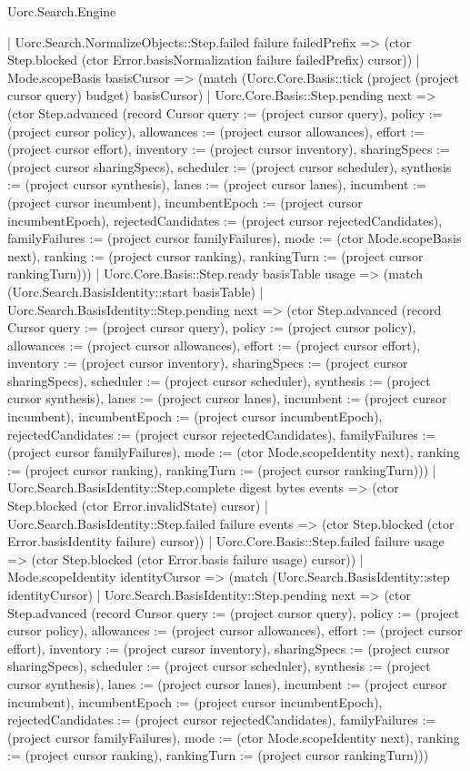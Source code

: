 \begin{lexlean}{Uorc.Search.Engine}
\begin{semanticmodule}
{      | Uorc.Search.NormalizeObjects::Step.failed failure failedPrefix => (ctor Step.blocked (ctor Error.basisNormalization failure failedPrefix) cursor))
    | Mode.scopeBasis basisCursor => (match (Uorc.Core.Basis::tick (project (project cursor query) budget) basisCursor)
      | Uorc.Core.Basis::Step.pending next => (ctor Step.advanced (record Cursor {query := (project cursor query), policy := (project cursor policy), allowances := (project cursor allowances), effort := (project cursor effort), inventory := (project cursor inventory), sharingSpecs := (project cursor sharingSpecs), scheduler := (project cursor scheduler), synthesis := (project cursor synthesis), lanes := (project cursor lanes), incumbent := (project cursor incumbent), incumbentEpoch := (project cursor incumbentEpoch), rejectedCandidates := (project cursor rejectedCandidates), familyFailures := (project cursor familyFailures), mode := (ctor Mode.scopeBasis next), ranking := (project cursor ranking), rankingTurn := (project cursor rankingTurn)}))
      | Uorc.Core.Basis::Step.ready basisTable usage => (match (Uorc.Search.BasisIdentity::start basisTable)
        | Uorc.Search.BasisIdentity::Step.pending next => (ctor Step.advanced (record Cursor {query := (project cursor query), policy := (project cursor policy), allowances := (project cursor allowances), effort := (project cursor effort), inventory := (project cursor inventory), sharingSpecs := (project cursor sharingSpecs), scheduler := (project cursor scheduler), synthesis := (project cursor synthesis), lanes := (project cursor lanes), incumbent := (project cursor incumbent), incumbentEpoch := (project cursor incumbentEpoch), rejectedCandidates := (project cursor rejectedCandidates), familyFailures := (project cursor familyFailures), mode := (ctor Mode.scopeIdentity next), ranking := (project cursor ranking), rankingTurn := (project cursor rankingTurn)}))
        | Uorc.Search.BasisIdentity::Step.complete digest bytes events => (ctor Step.blocked (ctor Error.invalidState) cursor)
        | Uorc.Search.BasisIdentity::Step.failed failure events => (ctor Step.blocked (ctor Error.basisIdentity failure) cursor))
      | Uorc.Core.Basis::Step.failed failure usage => (ctor Step.blocked (ctor Error.basis failure usage) cursor))
    | Mode.scopeIdentity identityCursor => (match (Uorc.Search.BasisIdentity::step identityCursor)
      | Uorc.Search.BasisIdentity::Step.pending next => (ctor Step.advanced (record Cursor {query := (project cursor query), policy := (project cursor policy), allowances := (project cursor allowances), effort := (project cursor effort), inventory := (project cursor inventory), sharingSpecs := (project cursor sharingSpecs), scheduler := (project cursor scheduler), synthesis := (project cursor synthesis), lanes := (project cursor lanes), incumbent := (project cursor incumbent), incumbentEpoch := (project cursor incumbentEpoch), rejectedCandidates := (project cursor rejectedCandidates), familyFailures := (project cursor familyFailures), mode := (ctor Mode.scopeIdentity next), ranking := (project cursor ranking), rankingTurn := (project cursor rankingTurn)}))
}
\end{semanticmodule}
\end{lexlean}
